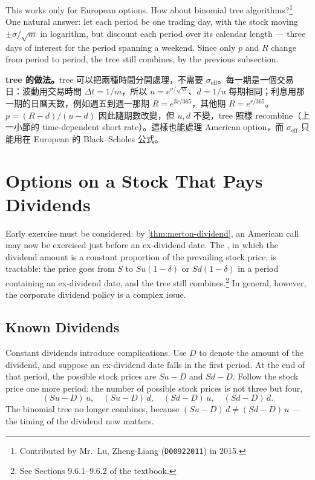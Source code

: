This works only for European options.
How about binomial tree algorithms?\footnote{Contributed by Mr.~Lu, Zheng-Liang (\texttt{D00922011}) in 2015.}
\suppstart
One natural answer: let each period be one trading day, with the stock moving $\pm\sigma/\sqrt{m}$ in logarithm, but discount each period over its calendar length --- three days of interest for the period spanning a weekend.
Since only $p$ and $R$ change from period to period, the tree still combines, by the previous subsection.

\begin{remark}
	\textbf{tree 的做法。}tree 可以把兩種時間分開處理，不需要 $\sigma_{\mathrm{eff}}$。每一期是一個交易日：波動用交易時間 $\Delta t=1/m$，所以 $u=e^{\sigma/\sqrt{m}}$、$d=1/u$ 每期相同；利息用那一期的日曆天數，例如週五到週一那期 $R=e^{3r/365}$，其他期 $R=e^{r/365}$。$p=(R-d)/(u-d)$ 因此隨期數改變，但 $u,d$ 不變，tree 照樣 recombine（上一小節的 time-dependent short rate）。這樣也能處理 American option，而 $\sigma_{\mathrm{eff}}$ 只能用在 European 的 Black--Scholes 公式。
\end{remark}
\suppend

\section{Options on a Stock That Pays Dividends}
\label{sec:dividends-tree}


Early exercise must be considered: by \autoref{thm:merton-dividend}, an American call may now be exercised just before an ex-dividend date.
The , in which the dividend amount is a constant proportion of the prevailing stock price, is tractable: the price goes from $S$ to $Su(1-\delta)$ or $Sd(1-\delta)$ in a period containing an ex-dividend date, and the tree still combines.\footnote{See Sections 9.6.1--9.6.2 of the textbook.}
In general, however, the corporate dividend policy is a complex issue.

\subsection{Known Dividends}


Constant dividends introduce complications.
Use $D$ to denote the amount of the dividend, and suppose an ex-dividend date falls in the first period.
At the end of that period, the possible stock prices are $Su-D$ and $Sd-D$.
Follow the stock price one more period: the number of possible stock prices is not three but four,
\[
	(Su-D)\,u ,\quad (Su-D)\,d ,\quad (Sd-D)\,u ,\quad (Sd-D)\,d .
\]
The binomial tree no longer combines, because $(Su-D)\,d\ne(Sd-D)\,u$ --- the timing of the dividend now matters.


